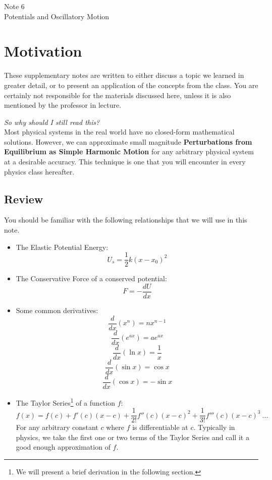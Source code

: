 \documentclass[11pt]{article}
\theoremstyle{gangnamstyle}{\newtheorem{definition}{Definition}[]}
\theoremstyle{gangnamstyle}{\newtheorem{example}{Example}[]}
\theoremstyle{gangnamstyle}{\newtheorem{problem}{Problem}[]}
\theoremstyle{gangnamstyle}{\newtheorem{warning}{Warning}[]}
\begin{document}
\normalfont
\pagestyle{pages}


\begin{center}
\vspace{3in}
{\Large Note 6 } \\[0.05in]
Potentials and Oscillatory Motion \\ [0.5in]
\end{center}


\section*{Motivation}

These supplementary notes are written to either discuss a topic we learned in greater detail, or to present an application of the concepts from the class. You are certainly not responsible for the materials discussed here, unless it is also mentioned by the professor in lecture. 

\textit{So why should I still read this?} \\
Most physical systems in the real world have no closed-form mathematical solutions. However, we can approximate small magnitude \textbf{Perturbations from Equilibrium as Simple Harmonic Motion} for any arbitrary physical system at a desirable accuracy. This technique is one that you will encounter in every physics class hereafter. 

\subsection*{Review}

You should be familiar with the following relationships that we will use in this note. 
\begin{itemize}
\item The Elastic Potential Energy:
\[ U_s = \frac{1}{2}k(x - x_0)^2 \]
\item The Conservative Force of a conserved potential: 
\[ F = - \frac{dU}{dx} \]
\item Some common derivatives: 
\[ \frac{d}{dx}(x^n) = nx^{n - 1} \]
\[ \frac{d}{dx}(e^{ax}) = ae^{ax} \]
\[ \frac{d}{dx}(\ln x) = \frac{1}{x} \]
\[ \frac{d}{dx}(\sin x) = \cos x \]
\[ \frac{d}{dx}(\cos x) = -\sin x \]

\pagebreak

\item The Taylor Series\footnote{We will present a brief derivation in the following section.} of a function $f$: 
\[ f(x) = f(c) + f'(c)(x - c) + \frac{1}{2!}f''(c)(x - c)^2 + \frac{1}{3!}f'''(c)(x - c)^3 \ ... \]
For any arbitrary constant $c$ where $f$ is differentiable at $c$. Typically in physics, we take the first one or two terms of the Taylor Series and call it a good enough approximation of $f$. 
\end{itemize}
\end{document}
